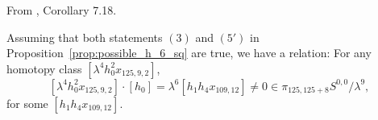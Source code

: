 \begin{corollary}
\label{paper:7.18}
From \cite{LWX126}, Corollary 7.18.\par
\label{cor:2ext125}
    Assuming that both statements $(3)$ and $(5')$ in Proposition~\ref{prop:possible_h_6_sq} are true, we have a relation: For any homotopy class $[\lambda^4 h_0^2x_{125,9,2}]$,
    $$[\lambda^4 h_0^2x_{125,9,2}] \cdot [h_0] = \lambda^6 [h_1h_4x_{109,12}] \neq 0 \in \pi_{125,125+8} S^{0,0}/\lambda^9,$$
    for some $[h_1h_4x_{109,12}]$.




\end{corollary}
